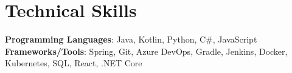 \section{Technical Skills}
 \begin{itemize}[leftmargin=0.15in, label={}]
    \small{\item{
      \textbf{Programming Languages}{: Java, Kotlin, Python, C\#, JavaScript} \\
     \textbf{Frameworks/Tools}{: Spring, Git, Azure DevOps, Gradle, Jenkins, Docker, Kubernetes, SQL, React, .NET Core }\\
    }}
 \end{itemize}